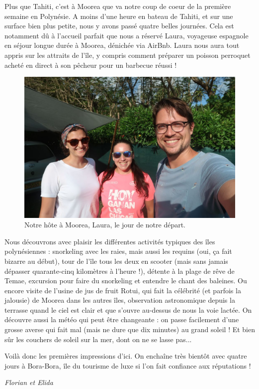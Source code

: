 Plus que Tahiti, c'est à Moorea que va notre coup de coeur de la
première semaine en Polynésie. A moins d'une heure en bateau de Tahiti,
et sur une surface bien plus petite, nous y avons passé quatre belles
journées. Cela est notamment dû à l'accueil parfait que nous a réservé
Laura, voyageuse espagnole en séjour longue durée à Moorea, dénichée via
AirBnb. Laura nous aura tout appris sur les attraits de l'île, y compris
comment préparer un poisson perroquet acheté en direct à son pêcheur
pour un barbecue réussi !

\begin{figure}
\centering
\includegraphics{images/20180810_moorea_laura.JPG}
\caption{Notre hôte à Moorea, Laura, le jour de notre départ.}
\end{figure}

Nous découvrons avec plaisir les différentes activités typiques des îles
polynésiennes : snorkeling avec les raies, mais aussi les requins (oui,
ça fait bizarre au début), tour de l'île tous les deux en scooter (mais
sans jamais dépasser quarante-cinq kilomètres à l'heure !), détente à la
plage de rêve de Temae, excursion pour faire du snorkeling et entendre
le chant des baleines. Ou encore visite de l'usine de jus de fruit
Rotui, qui fait la célébrité (et parfois la jalousie) de Moorea dans les
autres îles, observation astronomique depuis la terrasse quand le ciel
est clair et que s'ouvre au-dessus de nous la voie lactée. On découvre
aussi la météo qui peut être changeante : on passe facilement d'une
grosse averse qui fait mal (mais ne dure que dix minutes) au grand
soleil ! Et bien sûr les couchers de soleil sur la mer, dont on ne se
lasse pas...

Voilà donc les premières impressions d'ici. On enchaîne très bientôt
avec quatre jours à Bora-Bora, île du tourisme de luxe si l'on fait
confiance aux réputations !

\emph{Florian et Elida}


